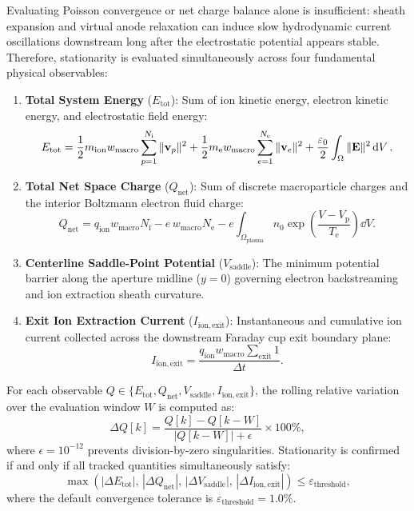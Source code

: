 \documentclass[11pt,a4paper]{article}
\begin{document}
Evaluating Poisson convergence or net charge balance alone is insufficient: sheath expansion and virtual anode relaxation can induce slow hydrodynamic current oscillations downstream long after the electrostatic potential appears stable. Therefore, stationarity is evaluated simultaneously across four fundamental physical observables:
\begin{enumerate}[nosep]
    \item \textbf{Total System Energy} ($E_{\mathrm{tot}}$): Sum of ion kinetic energy, electron kinetic energy, and electrostatic field energy:
    \begin{equation}
        E_{\mathrm{tot}} = \frac{1}{2} m_{\mathrm{ion}} w_{\mathrm{macro}} \sum_{p=1}^{N_{\mathrm{i}}} \|\vb{v}_p\|^2 + \frac{1}{2} m_{\mathrm{e}} w_{\mathrm{macro}} \sum_{e=1}^{N_{\mathrm{e}}} \|\vb{v}_e\|^2 + \frac{\varepsilon_0}{2} \int_{\Omega} \|\vb{E}\|^2 \dd{V}.
    \end{equation}
    \item \textbf{Total Net Space Charge} ($Q_{\mathrm{net}}$): Sum of discrete macroparticle charges and the interior Boltzmann electron fluid charge:
    \begin{equation}
        Q_{\mathrm{net}} = q_{\mathrm{ion}} w_{\mathrm{macro}} N_{\mathrm{i}} - e \, w_{\mathrm{macro}} N_{\mathrm{e}} - e \int_{\Omega_{\mathrm{plasma}}} n_0 \exp\!\left(\frac{V - V_{\mathrm{p}}}{T_{\mathrm{e}}}\right) \dd{V}.
    \end{equation}
    \item \textbf{Centerline Saddle-Point Potential} ($V_{\mathrm{saddle}}$): The minimum potential barrier along the aperture midline ($y = 0$) governing electron backstreaming and ion extraction sheath curvature.
    \item \textbf{Exit Ion Extraction Current} ($I_{\mathrm{ion,exit}}$): Instantaneous and cumulative ion current collected across the downstream Faraday cup exit boundary plane:
    \begin{equation}
        I_{\mathrm{ion,exit}} = \frac{q_{\mathrm{ion}} w_{\mathrm{macro}} \sum_{\mathrm{exit}} 1}{\Delta t}.
    \end{equation}
\end{enumerate}

For each observable $Q \in \{E_{\mathrm{tot}}, Q_{\mathrm{net}}, V_{\mathrm{saddle}}, I_{\mathrm{ion,exit}}\}$, the rolling relative variation over the evaluation window $W$ is computed as:
\begin{equation}
    \Delta Q[k] = \frac{Q[k] - Q[k-W]}{|Q[k-W]| + \epsilon} \times 100\%,
\end{equation}
where $\epsilon = 10^{-12}$ prevents division-by-zero singularities. Stationarity is confirmed if and only if all tracked quantities simultaneously satisfy:
\begin{equation}
    \max\!\left(|\Delta E_{\mathrm{tot}}|, \, |\Delta Q_{\mathrm{net}}|, \, |\Delta V_{\mathrm{saddle}}|, \, |\Delta I_{\mathrm{ion,exit}}|\right) \le \varepsilon_{\mathrm{threshold}},
\end{equation}
where the default convergence tolerance is $\varepsilon_{\mathrm{threshold}} = 1.0\%$. 
\end{document}
